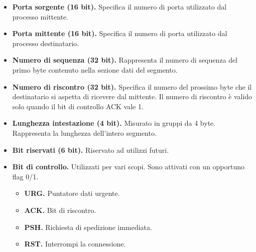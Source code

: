         \begin{itemize}
            \item 
                \textbf{Porta sorgente (16 bit).} Specifica il numero di porta utilizzato dal processo mittente.
                
            \item 
                \textbf{Porta mittente (16 bit).} Specifica il numero di porta utilizzato dal processo destinatario.
                
            \item 
                \textbf{Numero di sequenza (32 bit).} Rappresenta il numero di sequenza del primo byte contenuto nella sezione dati del segmento.
                
            \item 
                \textbf{Numero di riscontro (32 bit).} Specifica il numero del prossimo byte che il destinatario si aspetta di ricevere dal mittente. Il numero di riscontro è valido solo quando il bit di controllo ACK vale 1.
                
            \item 
                \textbf{Lunghezza intestazione (4 bit).} Misurato in gruppi da 4 byte. Rappresenta la lunghezza dell'intero segmento.
                
            \item 
                \textbf{Bit riservati (6 bit).} Riservato ad utilizzi futuri.
                
            \item 
                \textbf{Bit di controllo.} Utilizzati per vari scopi. Sono attivati con un opportuno flag 0/1.
                    \begin{itemize}
                        \item 
                            \textbf{URG.} Puntatore dati urgente.
                        
                        \item 
                            \textbf{ACK.} Bit di riscontro.
                            
                        \item 
                            \textbf{PSH.} Richiesta di spedizione immediata.
                            
                        \item 
                            \textbf{RST.} Interrompi la connessione.
                            

\end{itemize}
\end{itemize}
